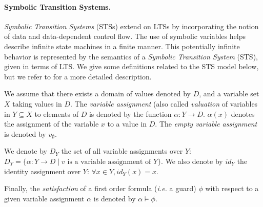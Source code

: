 \paragraph{Symbolic Transition Systems.}
\label{sec:definitions:sts}

\textit{Symbolic Transition Systems} (STSs)
\cite{hennessy1995symbolic} extend on LTSs by incorporating the
notion of data and data-dependent control flow.  The use of
symbolic variables helps describe infinite state machines in a
finite manner. This potentially infinite behavior is represented
by the semantics of a \emph{Symbolic Transition System} (STS),
given in terms of LTS. We give some definitions related to the
STS model below, but we refer to \cite{FTW05} for a more detailed
description.

\begin{definition}
    We assume that there exists a domain of values denoted by
    $D$, and a variable set $X$ taking values in $D$. The
    \emph{variable assignment} (also called \emph{valuation} of
    variables in $Y \subseteq X$ to elements of $D$ is denoted by
    the function $\alpha: Y \rightarrow D$.  $\alpha(x)$ denotes
    the assignment of the variable $x$ to a value in $D$.
    The \emph{empty variable assignment} is denoted by $v_\emptyset$.

    We denote by $D_Y$ the set of all variable assignments over
    $Y$: $D_Y = \{ \alpha : Y \rightarrow D \mid v \text{ is a
    variable assignment of } Y \}$. We also denote by $id_Y$ the
    identity assignment over $Y$: $\forall x \in Y, id_Y(x)
    = x$.

    Finally, the \emph{satisfaction} of a first order formula
    \cite{huth2004logic} (\emph{i.e.} a guard) $\phi$ with
    respect to a given variable assignment $\alpha$ is denoted by
    $\alpha \models \phi$.
\end{definition}

